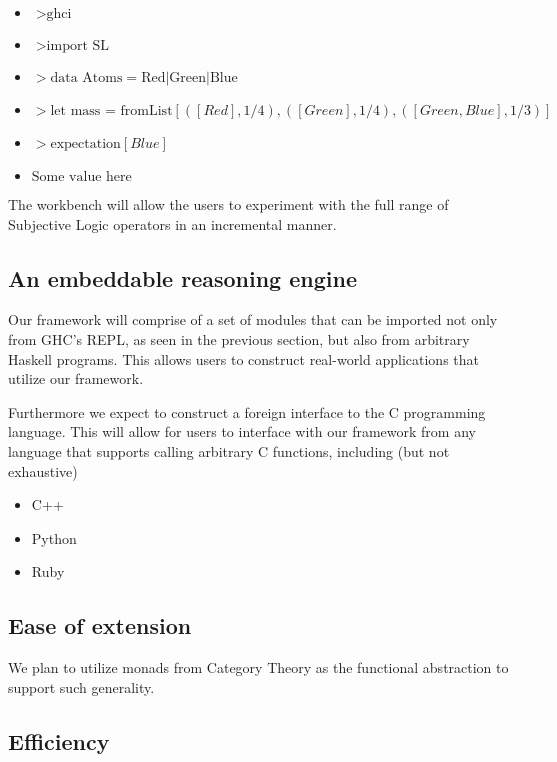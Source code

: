 \documentclass[a4paper]{article}
\begin{document}
\begin{itemize}
	\item $> \mbox{ghci}$
	\item $> \mbox{import SL}$
	\item $> \mbox{data Atoms} = \mbox{Red} | \mbox{Green} | \mbox{Blue}$
	\item $> \mbox{let mass = fromList} [ ([Red], 1/4), ([Green], 1/4), ([Green, Blue], 1/3) ]$
	\item $> \mbox{expectation} [Blue]$
	\item $\mbox{Some value here}$
\end{itemize}

\par
The workbench will allow the users to experiment with the full range of Subjective Logic operators in
an incremental manner.


\subsection{An embeddable reasoning engine}

\par
Our framework will comprise of a set of modules that can be imported not only from GHC's REPL, as seen
in the previous section, but also from arbitrary Haskell programs. This allows users to construct
real-world applications that utilize our framework. 

\par
Furthermore we expect to construct a foreign interface to the C programming language. This will allow
for users to interface with our framework from any language that supports calling arbitrary C functions,
including (but not exhaustive)

\begin{itemize}
	\item C++
	\item Python
	\item Ruby
\end{itemize}




\subsection{Ease of extension}

\par
We plan to utilize monads from Category Theory as the functional abstraction
to support such generality.

\subsection{Efficiency}
\end{document}
